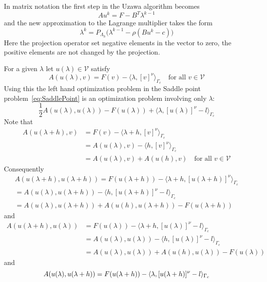 \documentclass[12pt,a4paper]{article}
\numberwithin{equation}{section}
\numberwithin{table}{section}
\numberwithin{figure}{section}
\newcommand{\half}{\ensuremath{\frac{1}{2}}}
\newcommand{\V}{\ensuremath{\mathcal{V}}}
\providecommand{\dualp}[2]{\langle #1, #2 \rangle}
\newcommand{\ulambda}{\ensuremath{u(\lambda)}}
\newcommand{\ulambdah}{\ensuremath{u(\lambda+h)}}
\newcommand{\ulh}{\ensuremath{u(h)}}
\newcommand{\qforall}{\quad\text{for all }}
\begin{document}
In matrix notation the first step in the Uzawa algorithm becomes
\begin{equation}
  A u^k = F - B^T \lambda^{k-1}
\end{equation}
and the new approximation to the Lagrange multiplier takes the form
\begin{equation}
  \lambda^k = P_{\Lambda_h}\bigl(\lambda^{k-1} - \rho(B u^k -c)\bigr) 
\end{equation}
Here the projection operator set negative elements in the vector to zero, the positive
elements are not changed by the projection.

For a given $\lambda$ let $\ulambda\in \V$ satisfy
\begin{equation}
  A(\ulambda, v) = F(v) - \dualp{\lambda}{[v]^\nu}_{\Gamma_c}
  \qforall v\in \V
\end{equation}
Using this the left hand optimization problem in the Saddle point
problem~\ref{eq:SaddlePoint} is an optimization problem involving only $\lambda$:
\begin{equation}
\half A(\ulambda,\ulambda) - F(\ulambda) + \dualp{\lambda}{[\ulambda]^\nu - l}_{\Gamma_c}  
\end{equation}
Note that
\begin{align}
  A(\ulambdah, v) &= F(v) - \dualp{\lambda+h}{[v]^\nu}_{\Gamma_c} \\
  &= A(\ulambda, v) - \dualp{h}{[v]^\nu}_{\Gamma_c} \\
  &= A(\ulambda, v) + A(\ulh,v)
  \qforall v\in \V
\end{align}
Consequently
\begin{multline}
  A(\ulambdah, \ulambdah) = F(\ulambdah) - \dualp{\lambda+h}{[\ulambdah]^\nu}_{\Gamma_c} \\
  = A(\ulambda, \ulambdah) - \dualp{h}{[\ulambdah]^\nu - l}_{\Gamma_c} \\
  = A(\ulambda, \ulambdah) + A(\ulh,\ulambdah) - F(\ulambdah)
\end{multline}
and
\begin{align}
  A(\ulambdah, \ulambda) &= F(\ulambda) - \dualp{\lambda+h}{[\ulambda]^\nu - l}_{\Gamma_c} \\
  &= A(\ulambda, \ulambda) - \dualp{h}{[\ulambda]^\nu - l}_{\Gamma_c} \\
  &= A(\ulambda, \ulambda) + A(\ulh,\ulambda) - F(\ulambda)
\end{align}
and
\begin{equation}
  A(\ulambda, \ulambdah) = F(\ulambdah) - \dualp{\lambda}{[\ulambdah]^\nu - l}_{\Gamma_c} \\
\end{equation}
\end{document}
